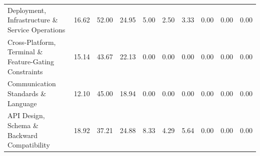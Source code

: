 {\begin{longtable}{l ccc ccc ccc}
Deployment, Infrastructure \& Service Operations & 16.62 & 52.00 & 24.95 & 5.00 & 2.50 & 3.33 & 0.00 & 0.00 & 0.00 \\
Cross-Platform, Terminal \& Feature-Gating Constraints & 15.14 & 43.67 & 22.13 & 0.00 & 0.00 & 0.00 & 0.00 & 0.00 & 0.00 \\
Communication Standards \& Language & 12.10 & 45.00 & 18.94 & 0.00 & 0.00 & 0.00 & 0.00 & 0.00 & 0.00 \\
API Design, Schema \& Backward Compatibility & 18.92 & 37.21 & 24.88 & 8.33 & 4.29 & 5.64 & 0.00 & 0.00 & 0.00 \\
\end{longtable}
}